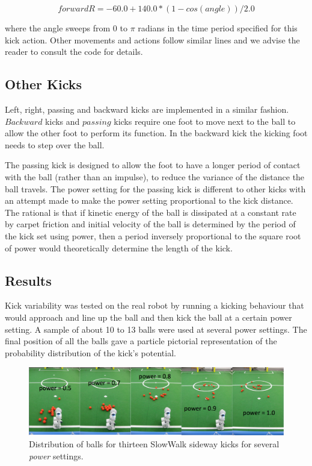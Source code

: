 \documentclass[pdftex,11pt,a4paper]{report}
\begin{document}
\begin{equation}
forwardR = -60.0 + 140.0 * (1 - cos(angle))/2.0
\end{equation}

where the angle sweeps from 0 to $\pi$ radians in the time period specified for this kick action. Other movements and actions follow similar lines and we advise the reader to consult the code for details.  

\subsection{Other Kicks}
Left, right, passing and backward kicks are implemented in a similar fashion. $Backward$ kicks and $passing$ kicks require one foot to move next to the ball to allow the other foot to perform its function. In the backward kick the kicking foot needs to step over the ball. 

The passing kick is designed to allow the foot to have a longer period of contact with the ball (rather than an impulse), to reduce the variance of the distance the ball travels. The power setting for the passing kick is different to other kicks with an attempt made to make the power setting proportional to the kick distance. The rational  is that if kinetic energy of the ball is dissipated at a constant rate by carpet friction and initial velocity of the ball is determined by the period of the kick set using power, then a period inversely proportional to the square root of power would theoretically determine the length of the kick.     

\subsection{Results}
Kick variability was tested on the real robot by running a kicking behaviour that would approach and line up the ball and then kick the ball at a certain power setting. A sample of about 10 to 13 balls were used at several power settings. The final position of all the balls gave a particle pictorial representation of the probability distribution of the kick's potential.

\begin{figure}[ht]
\centering
\includegraphics[width=1.0\textwidth]{figures/SlowWalkSideKickDistributions}
\caption{Distribution of balls for thirteen SlowWalk sideway kicks for several \emph{power} settings.} \label{figSlowWalkSideKickDistributions}
\end{figure} 
\end{document}
